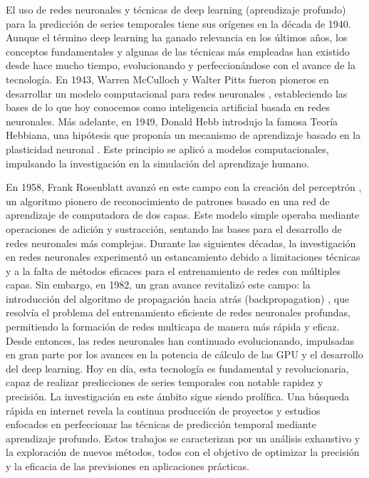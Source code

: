 El uso de redes neuronales y técnicas de deep learning (aprendizaje profundo) para la predicción de series temporales tiene sus orígenes en la década de 1940. Aunque el término deep learning ha ganado relevancia en los últimos años, los conceptos fundamentales y algunas de las técnicas más empleadas han existido desde hace mucho tiempo, evolucionando y perfeccionándose con el avance de la tecnología.
En 1943, Warren McCulloch y Walter Pitts fueron pioneros en desarrollar un modelo computacional para redes neuronales \cite{mcculloch1943}, 
estableciendo las bases de lo que hoy conocemos como inteligencia artificial basada en redes neuronales. 
Más adelante, en 1949, Donald Hebb introdujo la famosa Teoría Hebbiana, una hipótesis que proponía un mecanismo de aprendizaje basado en la plasticidad neuronal \cite{hebb1949}. 
Este principio se aplicó a modelos computacionales, impulsando la investigación en la simulación del aprendizaje humano.


En 1958, Frank Rosenblatt avanzó en este campo con la creación del perceptrón \cite{rosenblatt1958}, un algoritmo pionero de reconocimiento de patrones basado en una red de aprendizaje de computadora de dos capas.
Este modelo simple operaba mediante operaciones de adición y sustracción, sentando las bases para el desarrollo de redes neuronales más complejas.
Durante las siguientes décadas, la investigación en redes neuronales experimentó un estancamiento debido a limitaciones técnicas y a la falta de métodos eficaces para el entrenamiento de redes con múltiples capas. 
Sin embargo, en 1982, un gran avance revitalizó este campo: la introducción del algoritmo de propagación hacia atrás (backpropagation) \cite{werbos1982}, que resolvía el problema del entrenamiento eficiente de redes neuronales profundas, 
permitiendo la formación de redes multicapa de manera más rápida y eficaz.
Desde entonces, las redes neuronales han continuado evolucionando, impulsadas en gran parte por los avances en la potencia de cálculo de las GPU y el desarrollo del deep learning.
Hoy en día, esta tecnología es fundamental y revolucionaria, capaz de realizar predicciones de series temporales con notable rapidez y precisión.
La investigación en este ámbito sigue siendo prolífica. Una búsqueda rápida en internet revela la continua producción de proyectos y estudios enfocados 
en perfeccionar las técnicas de predicción temporal mediante aprendizaje profundo. Estos trabajos se caracterizan por un análisis exhaustivo y la exploración de nuevos métodos, 
todos con el objetivo de optimizar la precisión y la eficacia de las previsiones en aplicaciones prácticas.

